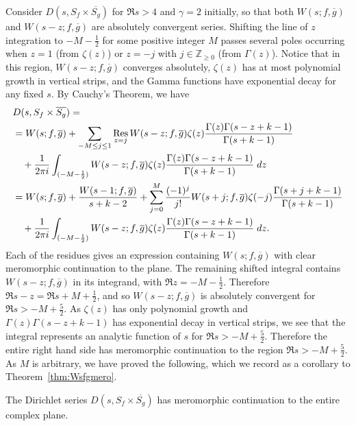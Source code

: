 Consider $D(s, S_f \times \overline{S_g})$ for $\Re s > 4$ and $\gamma = 2$ initially, so
that both $W(s; f, \overline{g})$ and $W(s-z; f, \overline{g})$ are absolutely convergent
series.
Shifting the line of $z$ integration to $-M - \frac{1}{2}$ for some positive integer $M$
passes several poles occurring when $z = 1$ (from $\zeta(z)$) or $z = -j$ with $j \in
\mathbb{Z}_{\geq 0}$ (from $\Gamma(z)$).
Notice that in this region, $W(s-z; f, \overline{g})$ converges absolutely, $\zeta(z)$ has
at most polynomial growth in vertical strips, and the Gamma functions have exponential
decay for any fixed $s$.
By Cauchy's Theorem, we have
\begin{align}
  &D(s, S_f \times \overline{S_g}) =\\
  &= W(s; f, \overline{g}) + \sum_{-M \leq j \leq 1} \operatorname*{Res}_{z = j} W(s-z; f, \overline{g})
  \zeta(z)\frac{\Gamma(z) \Gamma(s - z + k - 1)}{\Gamma(s + k - 1)} \\
  &\quad + \frac{1}{2\pi i} \int_{(-M - \frac{1}{2})} W(s-z; f, \overline{g})
  \zeta(z)\frac{\Gamma(z) \Gamma(s - z + k - 1)}{\Gamma(s + k - 1)} \; dz \\
  &= W(s; f, \overline{g}) + \frac{W(s-1; f, \overline{g})}{s+k-2} + \sum_{j = 0}^{M}
  \frac{(-1)^j}{j!} W(s + j; f, \overline{g}) \zeta(-j) \frac{\Gamma(s + j + k -
  1)}{\Gamma(s + k - 1)} \\
  &\quad + \frac{1}{2\pi i} \int_{(-M - \frac{1}{2})} W(s-z; f, \overline{g})
  \zeta(z)\frac{\Gamma(z) \Gamma(s - z + k - 1)}{\Gamma(s + k - 1)} \; dz.
\end{align}
Each of the residues gives an expression containing $W(s; f, \overline{g})$ with clear
meromorphic continuation to the plane.
The remaining shifted integral contains $W(s-z; f, \overline{g})$ in its integrand, with
$\Re z = -M-\tfrac{1}{2}$.
Therefore $\Re s-z = \Re s + M + \tfrac{1}{2}$, and so $W(s-z; f, \overline{g})$ is
absolutely convergent for $\Re s > -M + \tfrac{5}{2}$.
As $\zeta(z)$ has only polynomial growth and $\Gamma(z)\Gamma(s-z+k-1)$ has exponential
decay in vertical strips, we see that the integral represents an analytic function of $s$
for $\Re s > -M + \tfrac{5}{2}$.
Therefore the entire right hand side has meromorphic continuation to the region $\Re s >
-M + \tfrac{5}{2}$.
As $M$ is arbitrary, we have proved the following, which we record as a corollary to
Theorem~\ref{thm:Wsfgmero}.


\begin{corollary}\label{cor:DsSfSg_has_meromorphic}
  The Dirichlet series $D(s, S_f \times \overline{S_g})$ has meromorphic continuation to
  the entire complex plane.
\end{corollary}


